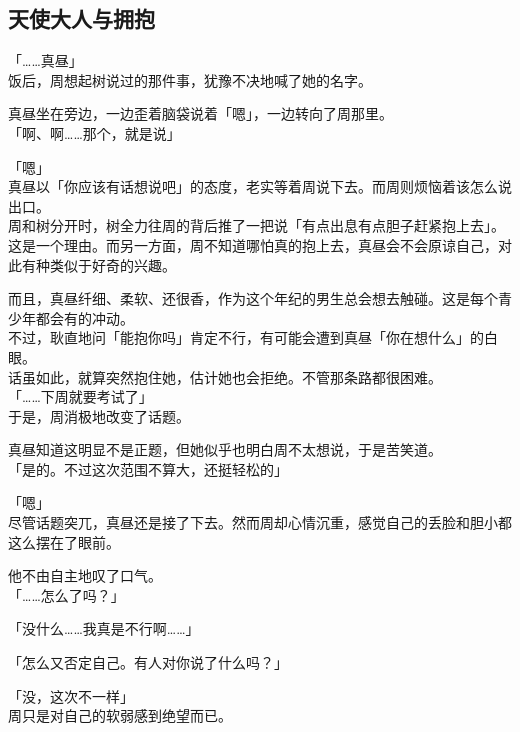 \subsection{天使大人与拥抱}

「……真昼」\\

饭后，周想起树说过的那件事，犹豫不决地喊了她的名字。

真昼坐在旁边，一边歪着脑袋说着「嗯」，一边转向了周那里。\\

「啊、啊……那个，就是说」

「嗯」\\

真昼以「你应该有话想说吧」的态度，老实等着周说下去。而周则烦恼着该怎么说出口。\\

周和树分开时，树全力往周的背后推了一把说「有点出息有点胆子赶紧抱上去」。这是一个理由。而另一方面，周不知道哪怕真的抱上去，真昼会不会原谅自己，对此有种类似于好奇的兴趣。

而且，真昼纤细、柔软、还很香，作为这个年纪的男生总会想去触碰。这是每个青少年都会有的冲动。\\

不过，耿直地问「能抱你吗」肯定不行，有可能会遭到真昼「你在想什么」的白眼。\\

话虽如此，就算突然抱住她，估计她也会拒绝。不管那条路都很困难。\\

「……下周就要考试了」\\

于是，周消极地改变了话题。

真昼知道这明显不是正题，但她似乎也明白周不太想说，于是苦笑道。\\

「是的。不过这次范围不算大，还挺轻松的」

「嗯」\\

尽管话题突兀，真昼还是接了下去。然而周却心情沉重，感觉自己的丢脸和胆小都这么摆在了眼前。

他不由自主地叹了口气。\\

「……怎么了吗？」

「没什么……我真是不行啊……」

「怎么又否定自己。有人对你说了什么吗？」

「没，这次不一样」\\

周只是对自己的软弱感到绝望而已。\\

